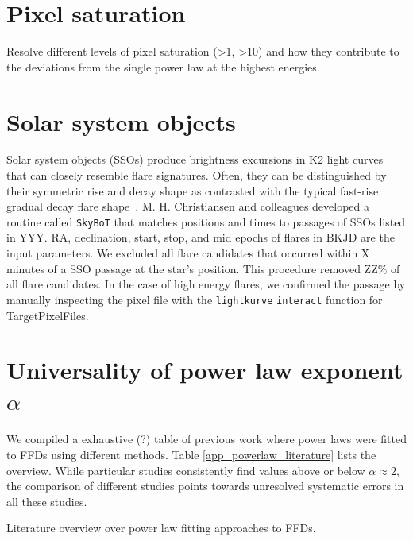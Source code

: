 \documentclass{aa}
\begin{document}
\begin{appendix}
\section{Pixel saturation}
Resolve different levels of pixel saturation (>1, >10) and how they contribute to the deviations from the single power law at the highest energies.
\section{Solar system objects}
Solar system objects (SSOs) produce brightness excursions in K2 light curves that can closely resemble flare signatures. Often, they can be distinguished by their symmetric rise and decay shape as contrasted with the typical fast-rise gradual decay flare shape~\citep{davenport_kepler_2014}.
M. H. Christiansen and colleagues developed a routine called \texttt{SkyBoT} that matches positions and times to passages of SSOs listed in YYY. RA, declination, start, stop, and mid epochs of flares in BKJD are the input parameters. We excluded all flare candidates that occurred within X minutes of a SSO passage at the star's position. This procedure removed ZZ\% of all flare candidates. In the case of high energy flares, we confirmed the passage by manually inspecting the pixel file with the \texttt{lightkurve} \texttt{interact} function for TargetPixelFiles.
\section{Universality of power law exponent $\alpha$}
We compiled a exhaustive (?) table of previous work where power laws were fitted to FFDs using different methods. Table \ref{app_powerlaw_literature} lists the overview. While particular studies consistently find values above or below $\alpha\approx2$, the comparison of different studies points towards unresolved systematic errors in all these studies. \begin{table}
\caption{Literature overview over power law fitting approaches to FFDs.}
\label{app_powerlaw_literature}
\centering

\end{table}


\end{appendix}
\end{document}
